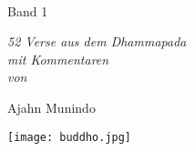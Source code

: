 \cleartorecto
\thispagestyle{empty}

\vspace*{1em}

{\centering

\\[0.4\baselineskip]
Band 1

\vfill

{\itshape 52 Verse aus dem Dhammapada\\
mit Kommentaren\\
von}

\vfill

Ajahn Munindo

\vfill

\texttt{[image: buddho.jpg]}
\vspace*{1.0em}


}
